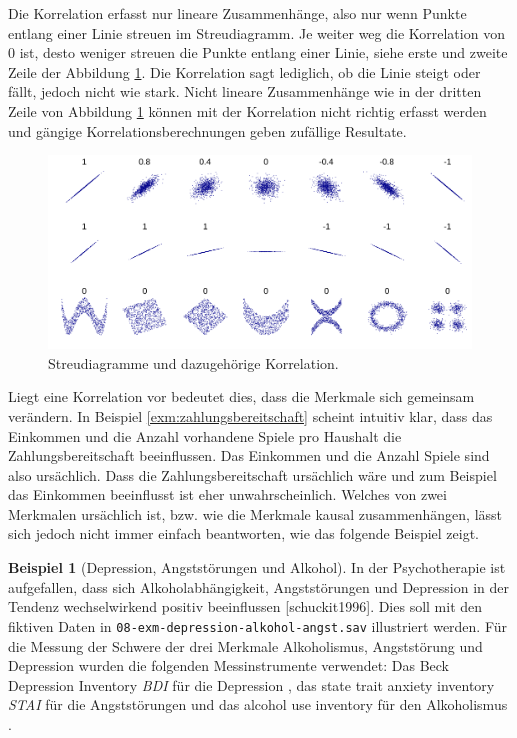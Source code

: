 \documentclass[
]{book}
\theoremstyle{definition}
\theoremstyle{definition}
\newtheorem{example}{Beispiel}[chapter]
\theoremstyle{definition}
\theoremstyle{definition}
\theoremstyle{remark}
\begin{document}
Die Korrelation erfasst nur lineare Zusammenhänge, also nur wenn Punkte entlang einer Linie streuen im Streudiagramm. Je weiter weg die Korrelation von \(0\) ist, desto weniger streuen die Punkte entlang einer Linie, siehe erste und zweite Zeile der Abbildung \ref{fig:correlation-examples}. Die Korrelation sagt lediglich, ob die Linie steigt oder fällt, jedoch nicht wie stark. Nicht lineare Zusammenhänge wie in der dritten Zeile von Abbildung \ref{fig:correlation-examples} können mit der Korrelation nicht richtig erfasst werden und gängige Korrelationsberechnungen geben zufällige Resultate.

\begin{figure}
\includegraphics[width=1\linewidth]{figures/Correlation-examples2} \caption{Streudiagramme und dazugehörige Korrelation.}\label{fig:correlation-examples}
\end{figure}

Liegt eine Korrelation vor bedeutet dies, dass die Merkmale sich gemeinsam verändern. In Beispiel \ref{exm:zahlungsbereitschaft} scheint intuitiv klar, dass das Einkommen und die Anzahl vorhandene Spiele pro Haushalt die Zahlungsbereitschaft beeinflussen. Das Einkommen und die Anzahl Spiele sind also ursächlich. Dass die Zahlungsbereitschaft ursächlich wäre und zum Beispiel das Einkommen beeinflusst ist eher unwahrscheinlich. Welches von zwei Merkmalen ursächlich ist, bzw. wie die Merkmale kausal zusammenhängen, lässt sich jedoch nicht immer einfach beantworten, wie das folgende Beispiel zeigt.

\begin{example}[Depression, Angststörungen und Alkohol]
\protect\hypertarget{exm:depression-alkohol-angst}{}\label{exm:depression-alkohol-angst}In der Psychotherapie ist aufgefallen, dass sich Alkoholabhängigkeit, Angststörungen und Depression in der Tendenz wechselwirkend positiv beeinflussen {[}schuckit1996{]}. Dies soll mit den fiktiven Daten in \texttt{08-exm-depression-alkohol-angst.sav} illustriert werden. Für die Messung der Schwere der drei Merkmale Alkoholismus, Angststörung und Depression wurden die folgenden Messinstrumente verwendet: Das Beck Depression Inventory \emph{BDI} für die Depression \citep{beck1988}, das state trait anxiety inventory \emph{STAI} für die Angststörungen \citep{spielberger1983manual} und das alcohol use inventory für den Alkoholismus \citep{skinner1982}.
\end{example}
\end{document}
